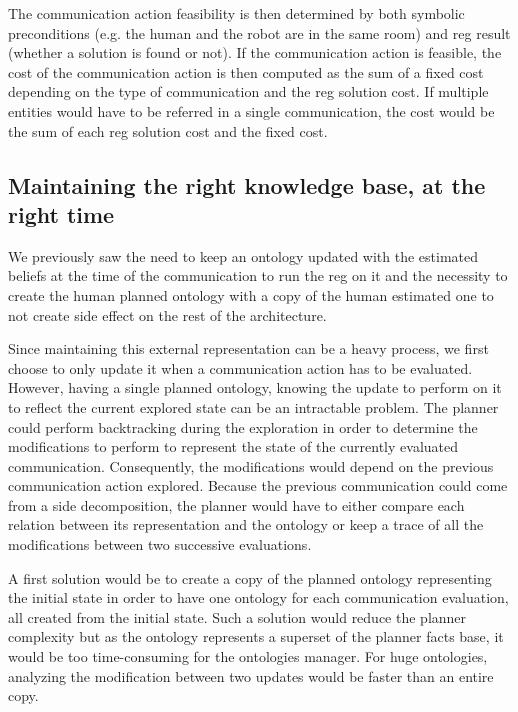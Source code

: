 The communication action feasibility is then determined by both symbolic preconditions (e.g. the human and the robot are in the same room) and \acrshort{reg} result (whether a solution is found or not). If the communication action is feasible, the cost of the communication action is then computed as the sum of a fixed cost depending on the type of communication and the \acrshort{reg} solution cost. If multiple entities would have to be referred in a single communication, the cost would be the sum of each \acrshort{reg} solution cost and the fixed cost.

\subsection{Maintaining the right knowledge base, at the right time}

We previously saw the need to keep an ontology updated with the estimated beliefs at the time of the communication to run the \acrshort{reg} on it and the necessity to create the human planned ontology with a copy of the human estimated one to not create side effect on the rest of the architecture.

Since maintaining this external representation can be a heavy process, we first choose to only update it when a communication action has to be evaluated. However, having a single planned ontology, knowing the update to perform on it to reflect the current explored state can be an intractable problem. The planner could perform backtracking during the exploration in order to determine the modifications to perform to represent the state of the currently evaluated communication. Consequently, the modifications would depend on the previous communication action explored. Because the previous communication could come from a side decomposition, the planner would have to either compare each relation between its representation and the ontology or keep a trace of all the modifications between two successive evaluations.

A first solution would be to create a copy of the planned ontology representing the initial state in order to have one ontology for each communication evaluation, all created from the initial state. Such a solution would reduce the planner complexity but as the ontology represents a superset of the planner facts base, it would be too time-consuming for the ontologies manager. For huge ontologies, analyzing the modification between two updates would be faster than an entire copy.


